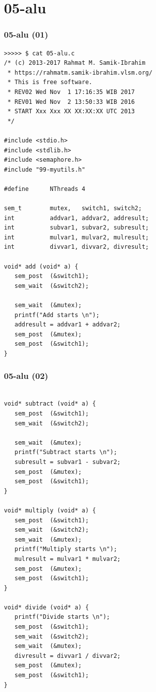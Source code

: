 \documentclass[xcolor=table, notheorems, hyperref={pdfpagelabels=false}]{beamer}
\begin{document}
\section{05-alu}
\begin{frame}[fragile]
\frametitle{05-alu (01)}
\begin{lstlisting}[basicstyle=\ttfamily\tiny]
>>>>> $ cat 05-alu.c
/* (c) 2013-2017 Rahmat M. Samik-Ibrahim
 * https://rahmatm.samik-ibrahim.vlsm.org/
 * This is free software.
 * REV02 Wed Nov  1 17:16:35 WIB 2017
 * REV01 Wed Nov  2 13:50:33 WIB 2016
 * START Xxx Xxx XX XX:XX:XX UTC 2013
 */

#include <stdio.h>
#include <stdlib.h>
#include <semaphore.h>
#include "99-myutils.h"

#define      NThreads 4

sem_t        mutex,   switch1, switch2;
int          addvar1, addvar2, addresult;
int          subvar1, subvar2, subresult;
int          mulvar1, mulvar2, mulresult;
int          divvar1, divvar2, divresult;

void* add (void* a) {
   sem_post  (&switch1);
   sem_wait  (&switch2);

   sem_wait  (&mutex);
   printf("Add starts \n");
   addresult = addvar1 + addvar2;
   sem_post  (&mutex);
   sem_post  (&switch1);
}

\end{lstlisting}
\end{frame}

\begin{frame}[fragile]
\frametitle{05-alu (02)}
\begin{lstlisting}[basicstyle=\ttfamily\tiny]

void* subtract (void* a) {
   sem_post  (&switch1);
   sem_wait  (&switch2);

   sem_wait  (&mutex);
   printf("Subtract starts \n");
   subresult = subvar1 - subvar2;
   sem_post  (&mutex);
   sem_post  (&switch1);
}

void* multiply (void* a) {
   sem_post  (&switch1);
   sem_wait  (&switch2);
   sem_wait  (&mutex);
   printf("Multiply starts \n");
   mulresult = mulvar1 * mulvar2;
   sem_post  (&mutex);
   sem_post  (&switch1);
}

void* divide (void* a) {
   printf("Divide starts \n");
   sem_post  (&switch1);
   sem_wait  (&switch2);
   sem_wait  (&mutex);
   divresult = divvar1 / divvar2;
   sem_post  (&mutex);
   sem_post  (&switch1);
}

\end{lstlisting}
\end{frame}
\end{document}

